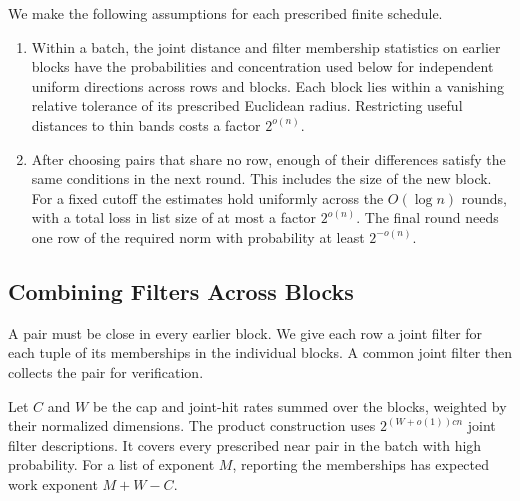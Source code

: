 \documentclass[runningheads,envcountsame,envcountsect,orivec]{llncs}
\begin{document}
\begin{model}
\label{def:model}
We make the following assumptions for each prescribed finite schedule.
\begin{enumerate}
\item Within a batch, the joint distance and filter membership
statistics on earlier blocks have the probabilities and concentration
used below for independent uniform directions across rows and
blocks. Each block lies within a vanishing relative tolerance of its
prescribed Euclidean radius. Restricting useful distances to thin bands costs a factor
$2^{o(n)}$.
\item After choosing pairs that share no row, enough of their
differences satisfy the same conditions in the next round.
This includes the size of the new block. For a fixed cutoff the
estimates hold uniformly across the $O(\log n)$ rounds, with a
total loss in list size of at most a factor $2^{o(n)}$.
The final round needs one row of the required norm with
probability at least $2^{-o(n)}$.
\end{enumerate}
\end{model}

\subsection{Combining Filters Across Blocks}
\label{sec:product-filters}

A pair must be close in every earlier block. We give each
row a joint filter for each tuple of its memberships in the
individual blocks. A common joint filter then collects the
pair for verification.

\begin{lemma}
\label{lem:filter}
Let $C$ and $W$ be the cap and joint-hit rates summed over
the blocks, weighted by their normalized dimensions. The
product construction uses $2^{(W+o(1))cn}$ joint filter
descriptions. It covers every prescribed near pair in the
batch with high probability. For a list of exponent $M$,
reporting the memberships has expected work exponent $M+W-C$.
\end{lemma}
\end{document}
